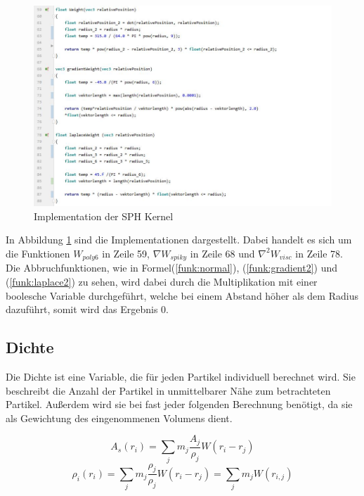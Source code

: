 \documentclass[intern,palatino]{cgBA}
\begin{document}
\begin{figure}[H]
	\centering
	\includegraphics[width=1.35\columnwidth]{Bilder/impKernel.jpg}
	\caption{Implementation der SPH Kernel}
	\label{img:impkernel}
\end{figure}

In Abbildung \ref{img:impkernel} sind die Implementationen dargestellt. Dabei handelt es sich um die Funktionen $W_{poly6}$ in Zeile 59, $\nabla W_{spiky}$ in Zeile 68 und $\nabla^2 W_{visc}$ in Zeile 78.\newline
Die Abbruchfunktionen, wie in Formel(\ref{funk:normal}), (\ref{funk:gradient2}) und (\ref{funk:laplace2}) zu sehen, wird dabei durch die Multiplikation mit einer boolesche Variable durchgeführt, welche bei einem Abstand höher als dem Radius dazuführt, somit wird das Ergebnis 0.


\subsection{Dichte}\label{dichte}

Die Dichte ist eine Variable, die für jeden Partikel individuell berechnet wird. Sie beschreibt die Anzahl der Partikel in unmittelbarer Nähe zum betrachteten Partikel. Außerdem wird sie bei fast jeder folgenden Berechnung benötigt, da sie als Gewichtung des eingenommenen Volumens dient. 

\begin{equation}\label{funk:skalar}
A_s(r_i) = \sum_j m_j \frac{A_j}{\rho_j} W(r_i-r_j)
\end{equation}
\begin{equation}\label{funk:density}
\rho_i(r_i) = \sum_j m_j \frac{\rho_j}{\rho_j} W(r_i-r_j) = \sum_j m_j  W(r_{i,j})
\end{equation}
\end{document}
